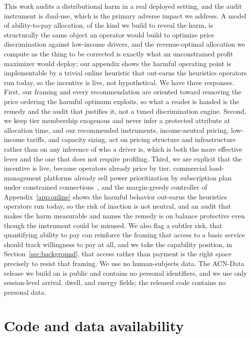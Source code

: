 \documentclass[manuscript, screen, review, anonymous]{acmart}
\begin{document}
This work audits a distributional harm in a real deployed setting, and the audit instrument is dual-use, which is the primary adverse impact we address. A model of ability-to-pay allocation, of the kind we build to reveal the harm, is structurally the same object an operator would build to optimize price discrimination against low-income drivers, and the revenue-optimal allocation we compute as the thing to be corrected is exactly what an unconstrained profit maximizer would deploy; our appendix shows the harmful operating point is implementable by a trivial online heuristic that out-earns the heuristics operators run today, so the incentive is live, not hypothetical. We have three responses. First, our framing and every recommendation are oriented toward removing the price ordering the harmful optimum exploits, so what a reader is handed is the remedy and the audit that justifies it, not a tuned discrimination engine. Second, we keep tier membership exogenous and never infer a protected attribute at allocation time, and our recommended instruments, income-neutral pricing, low-income tariffs, and capacity sizing, act on pricing structure and infrastructure rather than on any inference of who a driver is, which is both the more effective lever and the one that does not require profiling. Third, we are explicit that the incentive is live, because operators already price by tier, commercial load-management platforms already sell power prioritization by subscription plan under constrained connections~\cite{ampeco2026,ocpp201}, and the margin-greedy controller of Appendix~\ref{app:online} shows the harmful behavior out-earns the heuristics operators run today, so the risk of inaction is not neutral, and an audit that makes the harm measurable and names the remedy is on balance protective even though the instrument could be misused. We also flag a subtler risk, that quantifying ability to pay can reinforce the framing that access to a basic service should track willingness to pay at all, and we take the capability position, in Section~\ref{sec:background}, that access rather than payment is the right space precisely to resist that framing. We use no human-subjects data. The ACN-Data release we build on is public and contains no personal identifiers, and we use only session-level arrival, dwell, and energy fields; the released code contains no personal data.

\section*{Code and data availability}
\end{document}
